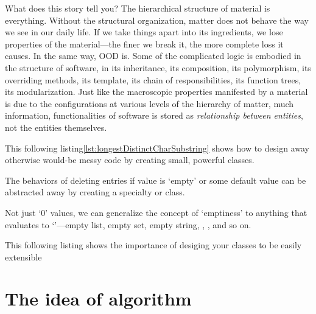What does this story tell you?
The hierarchical structure of material is everything.
Without the structural organization, matter does not behave the way we see in our daily life.
If we take things apart into its ingredients, we lose properties of the material---the finer we
break it, the more complete loss it causes.
In the same way, OOD is.
Some of the complicated logic is embodied in the structure of software, in its inheritance, its
composition, its polymorphism, its overriding methods, its template, its chain of
responsibilities, its function trees, its modularization.
Just like the macroscopic properties manifested by a material is due to the configurations at
various levels of the hierarchy of matter, much information, functionalities of software is stored
as \emph{relationship between entities}, not the entities themselves.

This following listing\ref{lst:longestDistinctCharSubstring} shows how to design away
otherwise would-be messy code by creating small, powerful classes.

The behaviors of deleting entries if value is `empty' or some default value can be abstracted
away by creating a specialty  or  class.

Not just `$0$' values, we can generalize the concept of `emptiness' to anything that evaluates to
`'---empty list, empty set, empty string, , , and so on.


\label{Evernote:Longest Substring with At Most K Distinct Characters}

This following listing shows the importance of desiging your classes to be easily extensible


\label{Evernote:Flatten 2D Vector}


\label{Evernote:Flatten 3D vector}

\section{The idea of algorithm}\label{sec:algorithm}

